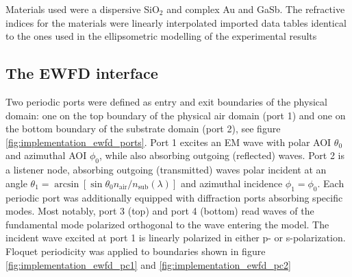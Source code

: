 Materials used were a dispersive SiO$_2$ and complex Au and GaSb. The refractive indices for the materials were linearly interpolated imported data tables identical to the ones used in the ellipsometric modelling of the experimental results  

\subsection{The EWFD interface}
Two periodic ports were defined as entry and exit boundaries of the physical domain: one on the top boundary of the physical air domain (port 1) and one on the bottom boundary of the substrate domain (port 2), see figure \ref{fig:implementation_ewfd_ports}. Port 1 excites an EM wave with polar AOI $\theta_0$ and azimuthal AOI $\phi_0$, while also absorbing outgoing (reflected) waves. Port 2 is a listener node, absorbing outgoing (transmitted) waves polar incident at an angle $\theta_1 = \arcsin[\sin\theta_0 n_{\text{air}}/n_{\text{sub}}(\lambda)]$ and azimuthal incidence $\phi_1=\phi_0$. Each periodic port was  additionally equipped with diffraction ports absorbing specific modes. Most notably, port 3 (top) and port 4 (bottom) read waves of the fundamental mode polarized orthogonal to the wave entering the model. The incident wave excited at port 1 is linearly polarized in either p- or s-polarization. Floquet periodicity was applied to boundaries shown in figure \ref{fig:implementation_ewfd_pc1} and \ref{fig:implementation_ewfd_pc2}

